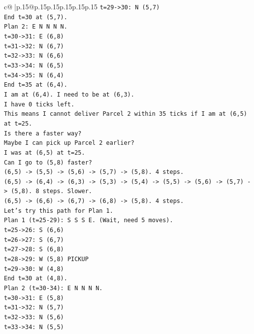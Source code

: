 \documentclass{article}
\begin{document}
{\begin{supertabular}{c@{$\;$}|p{.15\linewidth}@{}p{.15\linewidth}p{.15\linewidth}p{.15\linewidth}p{.15\linewidth}p{.15\linewidth}}
{{{\texttt{t=29{-}>30: N (5,7)} \\
\texttt{End t=30 at (5,7).} \\
\texttt{Plan 2: E N N N N.} \\
\texttt{t=30{-}>31: E (6,8)} \\
\texttt{t=31{-}>32: N (6,7)} \\
\texttt{t=32{-}>33: N (6,6)} \\
\texttt{t=33{-}>34: N (6,5)} \\
\texttt{t=34{-}>35: N (6,4)} \\
\texttt{End t=35 at (6,4).} \\
\texttt{I am at (6,4). I need to be at (6,3).} \\
\texttt{I have 0 ticks left.} \\
\texttt{This means I cannot deliver Parcel 2 within 35 ticks if I am at (6,5) at t=25.} \\
\texttt{Is there a faster way?} \\
\texttt{Maybe I can pick up Parcel 2 earlier?} \\
\texttt{I was at (6,5) at t=25.} \\
\texttt{Can I go to (5,8) faster?} \\
\texttt{(6,5) {-}> (5,5) {-}> (5,6) {-}> (5,7) {-}> (5,8). 4 steps.} \\
\texttt{(6,5) {-}> (6,4) {-}> (6,3) {-}> (5,3) {-}> (5,4) {-}> (5,5) {-}> (5,6) {-}> (5,7) {-}> (5,8). 8 steps. Slower.} \\
\texttt{(6,5) {-}> (6,6) {-}> (6,7) {-}> (6,8) {-}> (5,8). 4 steps.} \\
\texttt{Let's try this path for Plan 1.} \\
\texttt{Plan 1 (t=25{-}29): S S S E. (Wait, need 5 moves).} \\
\texttt{t=25{-}>26: S (6,6)} \\
\texttt{t=26{-}>27: S (6,7)} \\
\texttt{t=27{-}>28: S (6,8)} \\
\texttt{t=28{-}>29: W (5,8) PICKUP} \\
\texttt{t=29{-}>30: W (4,8)} \\
\texttt{End t=30 at (4,8).} \\
\texttt{Plan 2 (t=30{-}34): E N N N N.} \\
\texttt{t=30{-}>31: E (5,8)} \\
\texttt{t=31{-}>32: N (5,7)} \\
\texttt{t=32{-}>33: N (5,6)} \\
\texttt{t=33{-}>34: N (5,5)} \\
}}}
\end{supertabular}}
\end{document}
